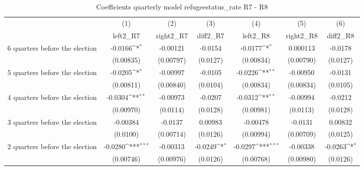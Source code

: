 \begin{table}[htbp]\centering
\def\sym#1{\ifmmode^{#1}\else\(^{#1}\)\fi}
\caption{Coefficients quarterly model refugeestatus\_rate R7 - R8}
\begin{tabular}{l*{6}{c}}
\hline\hline
                    &\multicolumn{1}{c}{(1)}&\multicolumn{1}{c}{(2)}&\multicolumn{1}{c}{(3)}&\multicolumn{1}{c}{(4)}&\multicolumn{1}{c}{(5)}&\multicolumn{1}{c}{(6)}\\
                    &\multicolumn{1}{c}{left2\_R7}&\multicolumn{1}{c}{right2\_R7}&\multicolumn{1}{c}{diff2\_R7}&\multicolumn{1}{c}{left2\_R8}&\multicolumn{1}{c}{right2\_R8}&\multicolumn{1}{c}{diff2\_R8}\\
\hline
 6 quarters before the election&     -0.0166\sym{*}  &    -0.00121         &     -0.0154         &     -0.0177\sym{*}  &    0.000113         &     -0.0178         \\
                    &   (0.00835)         &   (0.00797)         &    (0.0127)         &   (0.00834)         &   (0.00790)         &    (0.0127)         \\
[1em]
 5 quarters before the election&     -0.0205\sym{*}  &    -0.00997         &     -0.0105         &     -0.0226\sym{**} &    -0.00950         &     -0.0131         \\
                    &   (0.00811)         &   (0.00840)         &    (0.0104)         &   (0.00834)         &   (0.00834)         &    (0.0105)         \\
[1em]
 4 quarters before the election&     -0.0304\sym{**} &    -0.00973         &     -0.0207         &     -0.0312\sym{**} &    -0.00994         &     -0.0212         \\
                    &   (0.00970)         &    (0.0114)         &    (0.0128)         &   (0.00981)         &    (0.0113)         &    (0.0128)         \\
[1em]
 3 quarters before the election&    -0.00384         &     -0.0137         &     0.00983         &    -0.00478         &     -0.0131         &     0.00832         \\
                    &    (0.0100)         &   (0.00714)         &    (0.0126)         &   (0.00994)         &   (0.00709)         &    (0.0125)         \\
[1em]
 2 quarters before the election&     -0.0280\sym{***}&    -0.00313         &     -0.0249\sym{*}  &     -0.0297\sym{***}&    -0.00338         &     -0.0263\sym{*}  \\
                    &   (0.00746)         &   (0.00976)         &    (0.0126)         &   (0.00768)         &   (0.00980)         &    (0.0126)         \\

\end{tabular}
\end{table}
